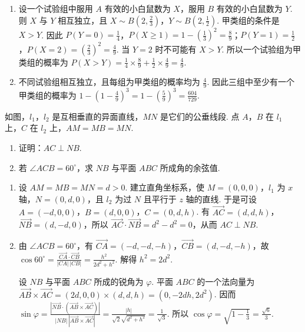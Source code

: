 \begin{solution}
\begin{enumerate}
\item 设一个试验组中服用 \(A\) 有效的小白鼠数为 \(X\)，服用 \(B\) 有效的小白鼠数为 \(Y\). 则 \(X\) 与 \(Y\) 相互独立，且 \(X\sim B\left(2,\frac{2}{3}\right)\)，\(Y\sim B\left(2,\frac{1}{2}\right)\). 甲类组的条件是 \(X>Y\). 因此
\(P(Y=0)=\frac{1}{4}\)，\(P(X\geqslant1)=1-\left(\frac{1}{3}\right)^{2}=\frac{8}{9}\)；\(P(Y=1)=\frac{1}{2}\)，\(P(X=2)=\left(\frac{2}{3}\right)^{2}=\frac{4}{9}\). 当 \(Y=2\) 时不可能有 \(X>Y\). 所以一个试验组为甲类组的概率为
\(P(X>Y)=\frac{1}{4}\times\frac{8}{9}+\frac{1}{2}\times\frac{4}{9}=\frac{4}{9}\).

\item 不同试验组相互独立，且每组为甲类组的概率均为 \(\frac{4}{9}\). 因此三组中至少有一个甲类组的概率为
\(1-\left(1-\frac{4}{9}\right)^{3}=1-\left(\frac{5}{9}\right)^{3}=\frac{604}{729}\).
\end{enumerate}
\end{solution}

\begin{problem}
如图，\(l_{1}\)，\(l_{2}\) 是互相垂直的异面直线，\(MN\) 是它们的公垂线段. 点 \(A\)，\(B\) 在 \(l_{1}\) 上，\(C\) 在 \(l_{2}\) 上，\(AM = MB = MN\).

\begin{enumerate}
\item 证明：\(AC \perp NB\).
\item 若 \(\angle ACB = 60^{\circ}\)，求 \(NB\) 与平面 \(ABC\) 所成角的余弦值.
\end{enumerate}

\end{problem}

\begin{solution}
\begin{enumerate}
\item 设 \(AM=MB=MN=d>0\). 建立直角坐标系，使 \(M=(0,0,0)\)，\(l_{1}\) 为 \(x\) 轴，\(N=(0,d,0)\)，且 \(l_{2}\) 为过 \(N\) 且平行于 \(z\) 轴的直线. 于是可设 \(A=(-d,0,0)\)，\(B=(d,0,0)\)，\(C=(0,d,h)\). 有
\(\overrightarrow{AC}=(d,d,h)\)，\(\overrightarrow{NB}=(d,-d,0)\)，所以 \(\overrightarrow{AC}\cdot\overrightarrow{NB}=d^{2}-d^{2}=0\)，从而 \(AC\perp NB\).

\item 由 \(\angle ACB=60^{\circ}\)，有 \(\overrightarrow{CA}=(-d,-d,-h)\)，\(\overrightarrow{CB}=(d,-d,-h)\)，故
\(\cos60^{\circ}=\frac{\overrightarrow{CA}\cdot\overrightarrow{CB}}{|CA|\,|CB|}=\frac{h^{2}}{2d^{2}+h^{2}}\). 解得 \(h^{2}=2d^{2}\).

设 \(NB\) 与平面 \(ABC\) 所成的锐角为 \(\varphi\). 平面 \(ABC\) 的一个法向量为
\(\overrightarrow{AB}\times\overrightarrow{AC}=(2d,0,0)\times(d,d,h)=(0,-2dh,2d^{2})\). 因而
\(\sin\varphi=\frac{|\overrightarrow{NB}\cdot(\overrightarrow{AB}\times\overrightarrow{AC})|}{|NB|\,|\overrightarrow{AB}\times\overrightarrow{AC}|}=\frac{|h|}{\sqrt{2}\sqrt{d^{2}+h^{2}}}=\frac{1}{\sqrt{3}}\).
所以 \(\cos\varphi=\sqrt{1-\frac{1}{3}}=\frac{\sqrt{6}}{3}\).
\end{enumerate}
\end{solution}

